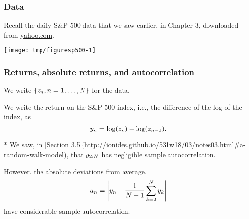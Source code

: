 \documentclass{beamer}
\begin{document}
\begin{frame}[fragile]

\frametitle{Data}

\bi

\item Recall the daily S&P 500 data that we saw earlier, in Chapter 3, downloaded from \url{yahoo.com}.

\ei

\begin{knitrout}\small
{}\color{fgcolor}\begin{kframe}
\begin{alltt}
 \hlkwb{<-} \hlstd{(}\hlstd{,}\hlstd{=}\hlstd{,}\hlstd{=}\hlstd{)}
 \hlkwb{<-} 
 \hlkwb{<-} \hlopt{$}\hlstd{Close[N}\hlopt{:}\hlstd{]} 
\hlstd{(}\hlstd{=}\hlstd{(}\hlstd{,}\hlstd{))}
\hlstd{=}\hlstd{)}
\hlstd{(}\hlstd{=}\hlstd{)}
\end{alltt}
\end{kframe}

{\centering \texttt{[image: tmp/figuresp500-1]} 

}



\end{knitrout}

\end{frame}

\begin{frame}[fragile]

\frametitle{Returns, absolute returns, and autocorrelation}

\bi

\item We write $\{z_n,n=1,\dots,N\}$ for the data.

\item We write the return on the S&P 500 index, i.e., the difference of the log of the index, as
$$ y_n=\log(z_n)-\log(z_{n-1}).$$

* We saw, in [Section 3.5](http://ionides.github.io/531w18/03/notes03.html#a-random-walk-model), that $y_{2:N}$ has negligible sample autocorrelation.

\item However, the absolute deviations from average, 
$$ a_n = \left| y_n - \frac{1}{N-1}\sum_{k=2}^N y_k \right|$$
have considerable sample autocorrelation.

\ei

\end{frame}
\end{document}
